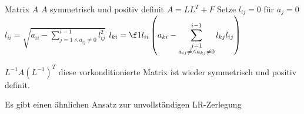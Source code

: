 \documentclass[a4paper]{scrartcl}
\numberwithin{equation}{section}
\begin{document}
\begin{alg}
	\label{alg:6.6}
	\begin{algorithmic}
		\Input Matrix $A$
		\Assume $A$ symmetrisch und positiv definit
		\Output $A=LL^T + F$
		\Statex
		\State Setze $l_{ij} = 0$ für $a_{j}=0$
			\State $\displaystyle l_{ii} = \sqrt{a_{ii}-\sum_{j=1\land a_{ij}\neq 0}^{i-1}l_{ij}^2}$
				\State $\displaystyle l_{ki} = \f 1{l_{ii}} \left(a_{ki} - \sum_{\substack{j=1\\ a_{ij}\neq   \land a_{kj}\neq 0}}^{i-1}l_{kj}l_{ij}\right)$
			\EndFor
		\EndFor
	\end{algorithmic}
	$L^{-1}A(L^{-1})^T$ diese vorkonditionierte Matrix ist wieder symmetrisch und positiv definit.
	\begin{note}
		Es gibt einen ähnlichen Ansatz zur unvollständigen LR-Zerlegung
	\end{note}
\end{alg}
\end{document}
